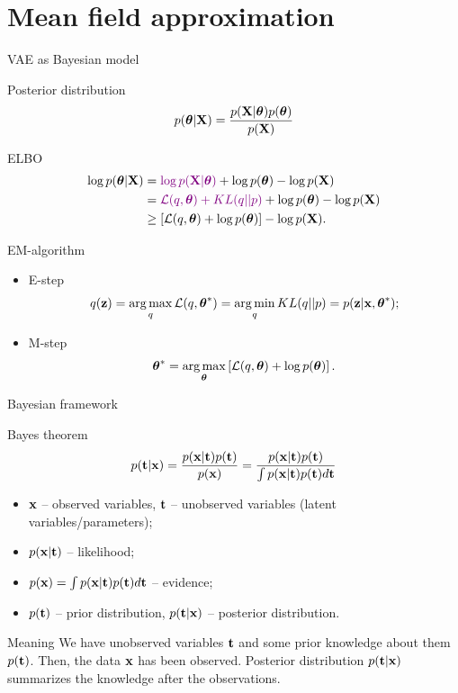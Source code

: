 \section{Mean field approximation}
\begin{frame}{VAE as Bayesian model}
	\begin{block}{Posterior distribution}
		\vspace{-0.2cm}
		\[
		p(\boldsymbol{\theta} | \mathbf{X}) = \frac{p(\mathbf{X} | \boldsymbol{\theta}) p(\boldsymbol{\theta})}{p(\mathbf{X})}
		\]
		\vspace{-0.5cm}
	\end{block}
	\begin{block}{ELBO}
		\vspace{-0.5cm}
		\begin{align*}
			\log p(\boldsymbol{\theta} | \mathbf{X}) &= {\color{violet}\log p(\mathbf{X} | \boldsymbol{\theta})} + \log p(\boldsymbol{\theta}) - \log p(\mathbf{X}) \\
			&= {\color{violet}\mathcal{L}(q, \boldsymbol{\theta}) + KL(q || p)} + \log p(\boldsymbol{\theta}) - \log p(\mathbf{X}) \\
			&\geq \left[ \mathcal{L}(q, \boldsymbol{\theta}) + \log p(\boldsymbol{\theta}) \right] - \log p(\mathbf{X}) .
		\end{align*}
		\vspace{-0.7cm}
	\end{block}
	\begin{block}{EM-algorithm}
		\begin{itemize}
			\item E-step
			\vspace{-0.2cm}
			\[
			q(\mathbf{z}) = \operatorname*{arg\,max}_q \mathcal{L} (q, \boldsymbol{\theta}^*) = \operatorname*{arg\,min}_q KL(q || p) =
			p(\mathbf{z}| \mathbf{x}, \boldsymbol{\theta}^*);
			\]
			\vspace{-0.5cm}
			\item M-step
			\[
			\boldsymbol{\theta}^* = \operatorname*{arg\,max}_{\boldsymbol{\theta}} \left[ \mathcal{L} (q, \boldsymbol{\theta}) + \log p(\boldsymbol{\theta}) \right].
			\]
		\end{itemize}
	\end{block}
\end{frame}
\begin{frame}{Bayesian framework}
	\begin{block}{Bayes theorem}
		\[
			p(\mathbf{t} | \mathbf{x}) = \frac{p(\mathbf{x} | \mathbf{t}) p(\mathbf{t})}{p(\mathbf{x})} = \frac{p(\mathbf{x} | \mathbf{t}) p(\mathbf{t})}{\int p(\mathbf{x} | \mathbf{t}) p(\mathbf{t}) d \mathbf{t}} 
		\]
		\begin{itemize}
			\item $\mathbf{x}$ -- observed variables, $\mathbf{t}$ -- unobserved variables (latent variables/parameters);
			\item $p(\mathbf{x} | \mathbf{t})$ -- likelihood;
			\item $p(\mathbf{x}) = \int p(\mathbf{x} | \mathbf{t}) p(\mathbf{t}) d \mathbf{t}$ -- evidence;
			\item $p(\mathbf{t})$ -- prior distribution, $p(\mathbf{t} | \mathbf{x})$ -- posterior distribution.
		\end{itemize}
	\end{block}
	\begin{block}{Meaning}
		We have unobserved variables $\mathbf{t}$ and some prior knowledge about them $p(\mathbf{t})$. Then, the data $\mathbf{x}$ has been observed. 
		Posterior distribution $p(\mathbf{t} | \mathbf{x})$ summarizes the knowledge after the observations.
	\end{block}
\end{frame}
